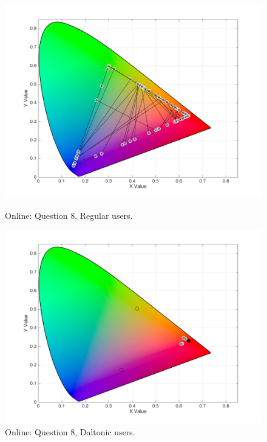 \begin{figure}[!htbp]
  \centering
  \begin{minipage}{0.4\textwidth}
    \centering
    \includegraphics[width=\textwidth]{images/results/8_online_regularUsers.png}
    \caption[Online: Answers for Question 8, from regular users.]{Online: Question 8, Regular users.}
    \label{fig:dalt_1}
  \end{minipage}
  \begin{minipage}{0.4\textwidth}
    \centering
    \includegraphics[width=\textwidth]{images/results/8_online_daltonicUsers.png}
    \caption[Online: Answers for Question 8, from daltonic users.]{Online: Question 8, Daltonic users.}
    \label{fig:dalt_2}
  \end{minipage}
\end{figure} \par
%
